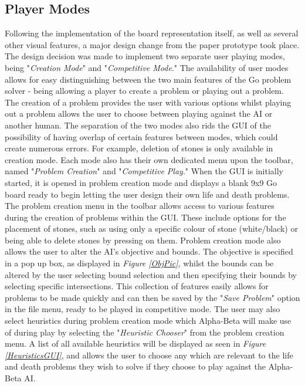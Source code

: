 \documentclass{l3proj}
\begin{document}
\subsection{Player Modes}

Following the implementation of the board representation itself, as well as several other visual features, a major design change from the paper prototype took place. The design decision was made to implement two separate user playing modes, being "\textit{Creation Mode}" and "\textit{Competitive Mode}." The availability of user modes allows for easy distinguishing between the two main features of the Go problem solver - being allowing a player to create a problem or playing out a problem. The creation of a problem provides the user with various options whilst playing out a problem allows the user to choose between playing against the AI or another human. The separation of the two modes also rids the GUI of the possibility of having overlap of certain features between modes, which could create numerous errors. For example, deletion of stones is only available in creation mode. Each mode also has their own dedicated menu upon the toolbar, named "\textit{Problem Creation}" and "\textit{Competitive Play}."
When the GUI is initially started, it is opened in problem creation mode and displays a blank 9x9 Go board ready to begin letting the user design their own life and death problems. The problem creation menu in the toolbar allows access to various features during the creation of problems within the GUI. These include options for the placement of stones, such as using only a specific colour of stone (white/black) or being able to delete stones by pressing on them. Problem creation mode also allows the user to alter the AI's objective and bounds. The objective is specified in a pop up box, as displayed in \textit{Figure \ref{ObjPic}}, whilst the bounds can be altered by the user selecting bound selection and then specifying their bounds by selecting specific intersections. This collection of features easily allows for problems to be made quickly and can then be saved by the "\textit{Save Problem}" option in the file menu, ready to be played in competitive mode. The user may also select heuristics during problem creation mode which Alpha-Beta will make use of during play by selecting the "\textit{Heuristic Chooser}" from the problem creation menu. A list of all available heuristics will be displayed as seen in \textit{Figure \ref{HeuristicsGUI}}, and allows the user to choose any which are relevant to the life and death problems they wish to solve if they choose to play against the Alpha-Beta AI.
\end{document}
